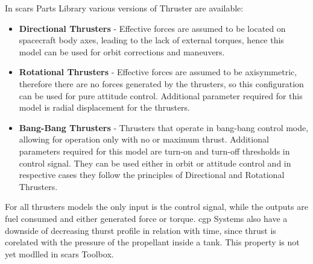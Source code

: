         In \ac{scars} Parts Library various versions of Thruster are available:
        \begin{itemize}
            \item \textbf{Directional Thrusters} - Effective forces are assumed to be located on spacecraft body axes, leading to the lack of external torques, hence this model can be used for orbit corrections and maneuvers.
            \item \textbf{Rotational Thrusters} - Effective forces are assumed to be axisymmetric, therefore there are no forces generated by the thrusters, so this configuration can be used for pure attitude control. Additional parameter required for this model is radial displacement for the thrusters. 
            \item \textbf{Bang-Bang Thrusters} - Thrusters that operate in bang-bang control mode, allowing for operation only with no or maximum thrust. Additional parameters required for this model are turn-on and turn-off thresholds in control signal. They can be used either in orbit or attitude control and in respective cases they follow the principles of Directional and Rotational Thrusters.
        \end{itemize}

        For all thrusters models the only input is the control signal, while the outputs are fuel consumed and either generated force or torque. \ac{cgp} Systems also have a downside of decreasing thurst profile in relation with time, since thrust is corelated with the pressure of the propellant inside a tank. This property is not yet modlled in \ac{scars} Toolbox. %

        
